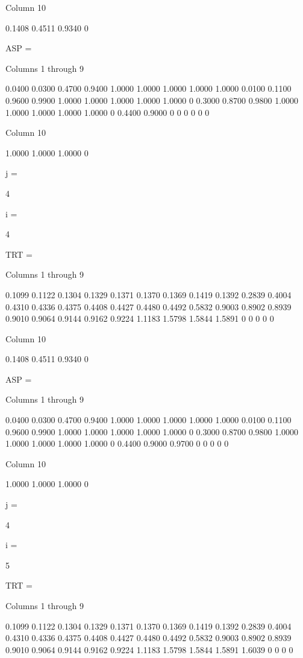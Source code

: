   Column 10

    0.1408
    0.4511
    0.9340
         0


ASP =

  Columns 1 through 9

    0.0400    0.0300    0.4700    0.9400    1.0000    1.0000    1.0000    1.0000    1.0000
    0.0100    0.1100    0.9600    0.9900    1.0000    1.0000    1.0000    1.0000    1.0000
         0    0.3000    0.8700    0.9800    1.0000    1.0000    1.0000    1.0000    1.0000
         0    0.4400    0.9000         0         0         0         0         0         0

  Column 10

    1.0000
    1.0000
    1.0000
         0


j =

     4


i =

     4


TRT =

  Columns 1 through 9

    0.1099    0.1122    0.1304    0.1329    0.1371    0.1370    0.1369    0.1419    0.1392
    0.2839    0.4004    0.4310    0.4336    0.4375    0.4408    0.4427    0.4480    0.4492
    0.5832    0.9003    0.8902    0.8939    0.9010    0.9064    0.9144    0.9162    0.9224
    1.1183    1.5798    1.5844    1.5891         0         0         0         0         0

  Column 10

    0.1408
    0.4511
    0.9340
         0


ASP =

  Columns 1 through 9

    0.0400    0.0300    0.4700    0.9400    1.0000    1.0000    1.0000    1.0000    1.0000
    0.0100    0.1100    0.9600    0.9900    1.0000    1.0000    1.0000    1.0000    1.0000
         0    0.3000    0.8700    0.9800    1.0000    1.0000    1.0000    1.0000    1.0000
         0    0.4400    0.9000    0.9700         0         0         0         0         0

  Column 10

    1.0000
    1.0000
    1.0000
         0


j =

     4


i =

     5


TRT =

  Columns 1 through 9

    0.1099    0.1122    0.1304    0.1329    0.1371    0.1370    0.1369    0.1419    0.1392
    0.2839    0.4004    0.4310    0.4336    0.4375    0.4408    0.4427    0.4480    0.4492
    0.5832    0.9003    0.8902    0.8939    0.9010    0.9064    0.9144    0.9162    0.9224
    1.1183    1.5798    1.5844    1.5891    1.6039         0         0         0         0

